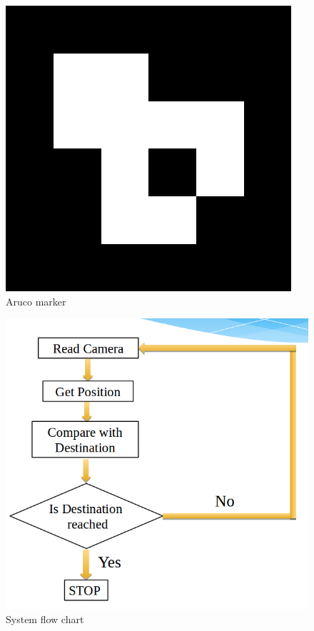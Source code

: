 \documentclass[]{exam}
\begin{document}
\begin{figure}[h!]


 \centering
 
  \includegraphics[scale=0.35]{out.png}
  \caption{Aruco marker  }
  \label{out}
  \end{figure}
\begin{figure}[h!]

 \centering
 
  \includegraphics[scale=0.6]{algo.png}
  \caption{System flow chart  }
  \label{algo}
  \end{figure}
  \newpage
\end{document}
